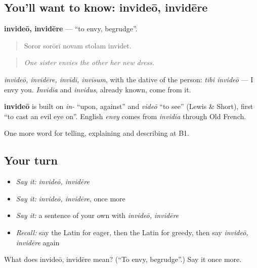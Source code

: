 \subsection*{You'll want to know: invideō, invidēre}
\textbf{invideō, invidēre} — \textquotedblleft{}to envy, begrudge\textquotedblright{}.

\begin{quote}
Soror sorōrī novam stolam invidet.
\end{quote}

\begin{quote}
\emph{One sister envies the other her new dress.}
\end{quote}

\emph{invideō, invidēre, invīdī, invīsum}, with the dative of the person: \emph{tibi invideō} — I envy you. \emph{Invidia} and \emph{invidus}, already known, come from it.

\begin{cousinweb}
\textbf{invideō} is built on \emph{in-} \textquotedblleft{}upon, against\textquotedblright{} and \emph{videō} \textquotedblleft{}to see\textquotedblright{} (Lewis \& Short), first \textquotedblleft{}to cast an evil eye on\textquotedblright{}. English \emph{envy} comes from \emph{invidia} through Old French.
\end{cousinweb}

\begin{grammarlens}[title={What you've built}]
One more word for telling, explaining and describing at B1.
\end{grammarlens}

\subsection*{Your turn}
\begin{itemize}
\raggedright
  \item \emph{Say it:} \emph{invideō, invidēre}
  \item \emph{Say it:} \emph{invideō, invidēre}, once more
  \item \emph{Say it:} a sentence of your own with \emph{invideō, invidēre}
  \item \emph{Recall:} say the Latin for eager, then the Latin for greedy, then say \emph{invideō, invidēre} again
\end{itemize}

\begin{tcolorbox}[breakable,colback=teal!4,colframe=teal!35!black,title={Before you move on}]
What does invideō, invidēre mean? (\textquotedblleft{}To envy, begrudge\textquotedblright{}.) Say it once more.
\end{tcolorbox}

